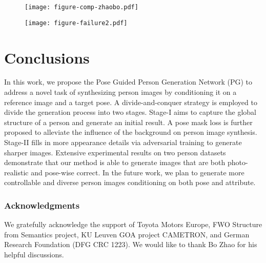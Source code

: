 \documentclass{article}
\begin{document}
\begin{figure}
\centering
\begin{minipage}{.43\textwidth}
  \centering
\texttt{[image: figure-comp-zhaobo.pdf]}
\label{comp-zhao}
\end{minipage}\hspace{0.2cm}
\begin{minipage}{.49\textwidth}
  \centering
\texttt{[image: figure-failure2.pdf]}
\label{failure}
\end{minipage}
\end{figure}
 
 \section{Conclusions}
In this work, we propose the Pose Guided Person Generation Network (PG) to address a novel task of synthesizing person images by conditioning it on a reference image and a target pose. A divide-and-conquer strategy is employed to divide the generation process into two stages. Stage-I aims to capture the global structure of a person and generate an initial result. A pose mask loss is further proposed to alleviate the influence of the background on person image synthesis. Stage-II fills in more appearance details via adversarial training to generate sharper images. 
Extensive experimental results on two person datasets demonstrate that our method is able to generate images that are both photo-realistic and pose-wise correct.
In the future work, we plan to generate more controllable and diverse person images conditioning on both pose and attribute.
 

\subsubsection*{Acknowledgments}
We gratefully acknowledge the support of Toyota Motors Europe, FWO Structure from Semantics project, KU Leuven GOA project CAMETRON, and German Research Foundation (DFG CRC 1223).
We would like to thank Bo Zhao for his helpful discussions. \small


\end{document}
